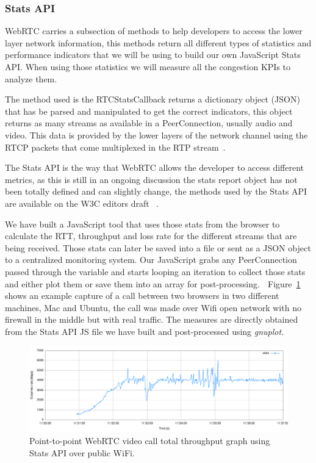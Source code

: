 \subsubsection{Stats API}

WebRTC carries a subsection of methods to help developers to access the lower layer network information, this methods return all different types of statistics and performance indicators that we will be using to build our own JavaScript Stats API. When using those statistics we will measure all the congestion KPIs to analyze them.

The method used is the RTCStatsCallback returns a dictionary object (JSON) that has be parsed and manipulated to get the correct indicators, this object returns as many streams as available in a PeerConnection, usually audio and video. This data is provided by the lower layers of the network channel using the RTCP packets that come multiplexed in the RTP stream~\cite{rtpusageIETF}.

The Stats API is the way that WebRTC allows the developer to access different metrics, as this is still in an ongoing discussion the stats report object has not been totally defined and can slightly change, the methods used by the Stats API are available on the W3C editors draft ~\cite{editorWebRTCdraft}. 

We have built a JavaScript tool that uses those stats from the browser to calculate the RTT, throughput and loss rate for the different streams that are being received. Those stats can later be saved into a file or sent as a JSON object to a centralized monitoring system. Our JavaScript grabs any PeerConnection passed through the variable and starts looping an iteration to collect those stats and either plot them or save them into an array for post-processing. 

Figure~\ref{fig:onetooneWifiRTC} shows an example capture of a call between two browsers in two different machines, Mac and Ubuntu, the call was made over Wifi open network with no firewall in the middle but with real traffic. The measures are directly obtained from the Stats API JS file we have built and post-processed using {\it gnuplot}.

 \begin{figure}[h]
  \centering
    \includegraphics[width=1\textwidth]{./figures/onetooneWifiStatsRTC.pdf}
      \caption[Point-to-point WebRTC video call total throughput graph using Stats API over public WiFi]{Point-to-point WebRTC video call total throughput graph using Stats API over public WiFi.}
	\label{fig:onetooneWifiRTC}
\end{figure}

